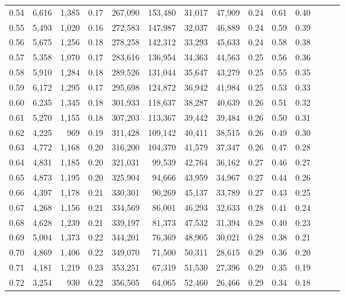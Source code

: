 \begin{tabular}{rrrrrrrrrrrrrr}
0.54 &  6,616 &  1,385 &  0.17 &  267,090 &  153,480 &  31,017 &  47,909 &  0.24 &  0.61 &      0.40 \\
0.55 &  5,493 &  1,020 &  0.16 &  272,583 &  147,987 &  32,037 &  46,889 &  0.24 &  0.59 &      0.39 \\
0.56 &  5,675 &  1,256 &  0.18 &  278,258 &  142,312 &  33,293 &  45,633 &  0.24 &  0.58 &      0.38 \\
0.57 &  5,358 &  1,070 &  0.17 &  283,616 &  136,954 &  34,363 &  44,563 &  0.25 &  0.56 &      0.36 \\
0.58 &  5,910 &  1,284 &  0.18 &  289,526 &  131,044 &  35,647 &  43,279 &  0.25 &  0.55 &      0.35 \\
0.59 &  6,172 &  1,295 &  0.17 &  295,698 &  124,872 &  36,942 &  41,984 &  0.25 &  0.53 &      0.33 \\
0.60 &  6,235 &  1,345 &  0.18 &  301,933 &  118,637 &  38,287 &  40,639 &  0.26 &  0.51 &      0.32 \\
0.61 &  5,270 &  1,155 &  0.18 &  307,203 &  113,367 &  39,442 &  39,484 &  0.26 &  0.50 &      0.31 \\
0.62 &  4,225 &    969 &  0.19 &  311,428 &  109,142 &  40,411 &  38,515 &  0.26 &  0.49 &      0.30 \\
0.63 &  4,772 &  1,168 &  0.20 &  316,200 &  104,370 &  41,579 &  37,347 &  0.26 &  0.47 &      0.28 \\
0.64 &  4,831 &  1,185 &  0.20 &  321,031 &   99,539 &  42,764 &  36,162 &  0.27 &  0.46 &      0.27 \\
0.65 &  4,873 &  1,195 &  0.20 &  325,904 &   94,666 &  43,959 &  34,967 &  0.27 &  0.44 &      0.26 \\
0.66 &  4,397 &  1,178 &  0.21 &  330,301 &   90,269 &  45,137 &  33,789 &  0.27 &  0.43 &      0.25 \\
0.67 &  4,268 &  1,156 &  0.21 &  334,569 &   86,001 &  46,293 &  32,633 &  0.28 &  0.41 &      0.24 \\
0.68 &  4,628 &  1,239 &  0.21 &  339,197 &   81,373 &  47,532 &  31,394 &  0.28 &  0.40 &      0.23 \\
0.69 &  5,004 &  1,373 &  0.22 &  344,201 &   76,369 &  48,905 &  30,021 &  0.28 &  0.38 &      0.21 \\
0.70 &  4,869 &  1,406 &  0.22 &  349,070 &   71,500 &  50,311 &  28,615 &  0.29 &  0.36 &      0.20 \\
0.71 &  4,181 &  1,219 &  0.23 &  353,251 &   67,319 &  51,530 &  27,396 &  0.29 &  0.35 &      0.19 \\
0.72 &  3,254 &    930 &  0.22 &  356,505 &   64,065 &  52,460 &  26,466 &  0.29 &  0.34 &      0.18 \\

\end{tabular}
